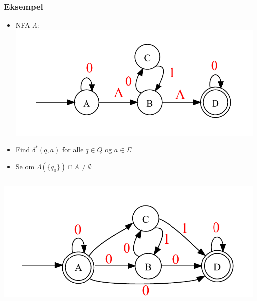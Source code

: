 \begin{frame}
\frametitle{Eksempel}
\begin{itemize}[<+->]
\item NFA-$\Lambda$:
  \includegraphics[scale=0.4]{images/2_seminar_lambdaelim}
\item Find $\delta^*(q,a)$ for alle $q\in Q$ og $a\in \Sigma$
\item Se om $\Lambda(\{q_0\})\cap A \neq \emptyset$
\end{itemize}

\begin{columns}
\column{5cm}
\column{5cm}
\includegraphics[scale=0.4]{images/2_seminar_lambdaelim2}
\end{columns}
\end{frame}

